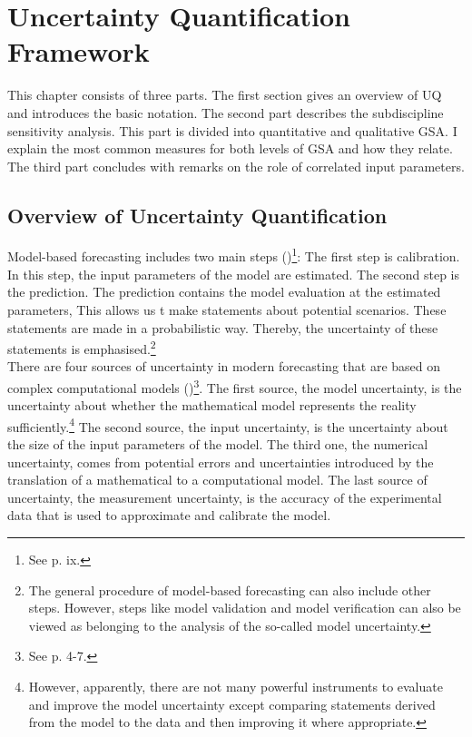 \newpage

\section{Uncertainty Quantification Framework}
\thispagestyle{plain} %

This chapter consists of three parts. The first section gives an overview of UQ and introduces the basic notation. The second part describes the subdiscipline sensitivity analysis. This part is divided into quantitative and qualitative GSA. I explain the most common measures for both levels of GSA and how they relate. The third part concludes with remarks on the role of correlated input parameters.

\subsection{Overview of Uncertainty Quantification}
Model-based forecasting includes two main steps (\cite{Smith.2014})\footnote{See p. ix.}: The first step is calibration. In this step, the input parameters of the model are estimated. The second step is the prediction. The prediction contains the model evaluation at the estimated parameters, This allows us t make statements about potential scenarios. These statements are made in a probabilistic way. Thereby, the uncertainty of these statements is emphasised.\footnote{The general procedure of model-based forecasting can also include other steps. However, steps like model validation and model verification can also be viewed as belonging to the analysis of the so-called model uncertainty.}\\
\newline
There are four sources of uncertainty in modern forecasting that are based on complex computational models (\cite{Smith.2014})\footnote{See p. 4-7.}. The first source, the model uncertainty, is the uncertainty about whether the mathematical model represents the reality sufficiently.\footnote{However, apparently, there are not many powerful instruments to evaluate and improve the model uncertainty except comparing statements derived from the model to the data and then improving it where appropriate.} The second source, the input uncertainty, is the uncertainty about the size of the input parameters of the model. The third one, the numerical uncertainty, comes from potential errors and uncertainties introduced by the translation of a mathematical to a computational model. The last source of uncertainty, the measurement uncertainty, is the accuracy of the experimental data that is used to approximate and calibrate the model.

